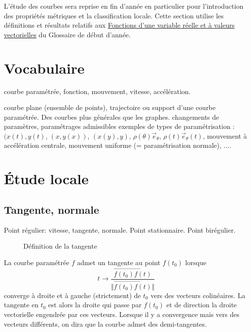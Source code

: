

L'étude des courbes sera reprise en fin d'année en particulier pour l'introduction des propriétés métriques et la classification locale.\newline
Cette section utilise les définitions et résultats relatifs aux \href{\baseurl C4199.pdf}{Fonctions d'une variable réelle et à valeurs vectorielles} du Glossaire de début d'année.
\section{Vocabulaire}
courbe paramétrée, fonction, mouvement, vitesse, accélération.

courbe plane (ensemble de points), trajectoire ou support d'une courbe paramétrée. Des courbes plus générales que les graphes.\newline
changements de paramètres, paramétrages admissibles\newline
exemples de types de paramétrisation : $(x(t),y(t)$, $(x,y(x))$, $(x(y),y)$, $\rho(\theta)\overrightarrow{e}_\theta$, $\rho(t)\overrightarrow{e}_\theta(t)$, mouvement à accélération centrale, mouvement uniforme (= paramétrisation normale), ....

\section{\'Etude locale}
\subsection{Tangente, normale}
Point régulier: vitesse, tangente, normale. Point stationnaire. Point birégulier.
\begin{figure}[!ht]
 \centering
 
 \caption{Définition de la tangente}
\end{figure}
\begin{defi}
 La courbe paramétrée $f$ admet un tangente au point $f(t_0)$ lorsque 
\begin{displaymath}
 t \rightarrow \dfrac{\overrightarrow{f(t_0)f(t)}}{\Vert \overrightarrow{f(t_0)f(t)}\Vert}
\end{displaymath}
converge à droite et à gauche (strictement) de $t_0$ vers des vecteurs colinéaires. La tangente en $t_0$ est alors la droite qui passe par $f(t_0)$ et de direction la droite vectorielle engendrée par ces vecteurs. Lorsque il y a convergence mais vers des vecteurs différents, on dira que la courbe admet des demi-tangentes. 
\end{defi}

